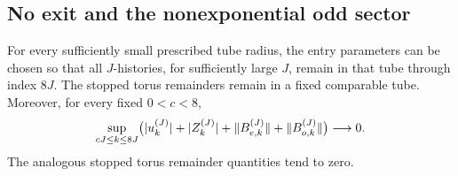 \subsection{No exit and the nonexponential odd sector}

\begin{lemma}
\label{lem:bulk-window-vanishing}
For every sufficiently small prescribed tube radius, the entry
parameters can be chosen so that all $J$-histories, for sufficiently
large $J$, remain in that tube through index $8J$.  The stopped
torus remainders remain in a fixed comparable tube.  Moreover,
for every fixed $0<c<8$,
\begin{equation}\label{eq:bulk-window-vanishing}
 \sup_{cJ\le k\le8J}
 \bigl(|u_k^{(J)}|+|Z_k^{(J)}|
       +\lVert B_{e,k}^{(J)}\rVert+\lVert B_{o,k}^{(J)}\rVert\bigr)
 \longrightarrow0.
\end{equation}
The analogous stopped torus remainder quantities tend to zero.
\end{lemma}


